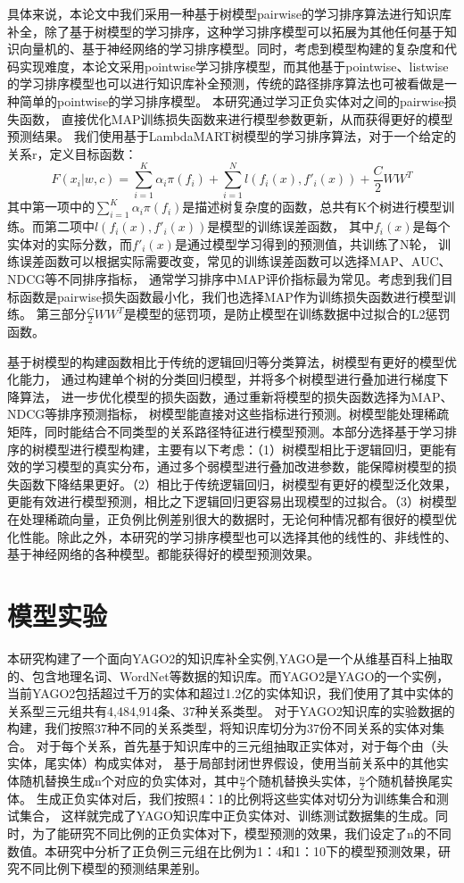 具体来说，本论文中我们采用一种基于树模型pairwise的学习排序算法进行知识库补全，除了基于树模型的学习排序，这种学习排序模型可以拓展为其他任何基于知识向量机的、基于神经网络的学习排序模型。同时，考虑到模型构建的复杂度和代码实现难度，本论文采用pointwise学习排序模型，而其他基于pointwise、listwise的学习排序模型也可以进行知识库补全预测，传统的路径排序算法也可被看做是一种简单的pointwise的学习排序模型。
本研究通过学习正负实体对之间的pairwise损失函数，
直接优化MAP训练损失函数来进行模型参数更新，从而获得更好的模型预测结果。
我们使用基于LambdaMART树模型的学习排序算法，对于一个给定的关系r，定义目标函数：
$$F(x_i|w,c)=\sum_{i=1}^K\alpha_i\pi(f_i)+\sum_{i=1}^Nl(f_i(x),f'_i(x))+\frac{C}{2}WW^T$$
其中第一项中的$\sum_{i=1}^K\alpha_i\pi(f_i)$是描述树复杂度的函数，总共有K个树进行模型训练。而第二项中$l(f_i(x),f'_i(x))$是模型的训练误差函数，
其中$f_i (x)$是每个实体对的实际分数，而$f'_i(x)$是通过模型学习得到的预测值，共训练了N轮，
训练误差函数可以根据实际需要改变，常见的训练误差函数可以选择MAP、AUC、NDCG等不同排序指标，
通常学习排序中MAP评价指标最为常见。考虑到我们目标函数是pairwise损失函数最小化，我们也选择MAP作为训练损失函数进行模型训练。
第三部分$\frac{C}{2}WW^T$是模型的惩罚项，是防止模型在训练数据中过拟合的L2惩罚函数。

基于树模型的构建函数相比于传统的逻辑回归等分类算法，树模型有更好的模型优化能力，
通过构建单个树的分类回归模型，并将多个树模型进行叠加进行梯度下降算法，
进一步优化模型的损失函数，通过重新将模型的损失函数选择为MAP、NDCG等排序预测指标，
树模型能直接对这些指标进行预测。树模型能处理稀疏矩阵，同时能结合不同类型的关系路径特征进行模型预测。本部分选择基于学习排序的树模型进行模型构建，主要有以下考虑：（1）树模型相比于逻辑回归，更能有效的学习模型的真实分布，通过多个弱模型进行叠加改进参数，能保障树模型的损失函数下降结果更好。（2）相比于传统逻辑回归，树模型有更好的模型泛化效果，更能有效进行模型预测，相比之下逻辑回归更容易出现模型的过拟合。（3）树模型在处理稀疏向量，正负例比例差别很大的数据时，无论何种情况都有很好的模型优化性能。除此之外，本研究的学习排序模型也可以选择其他的线性的、非线性的、基于神经网络的各种模型。都能获得好的模型预测效果。

\section{模型实验}
\label{cha:exp-relational}

本研究构建了一个面向YAGO2的知识库补全实例,YAGO是一个从维基百科上抽取的、包含地理名词、WordNet等数据的知识库。而YAGO2是YAGO的一个实例，
当前YAGO2包括超过千万的实体和超过1.2亿的实体知识，我们使用了其中实体的关系型三元组共有4,484,914条、37种关系类型。
对于YAGO2知识库的实验数据的构建，我们按照37种不同的关系类型，将知识库切分为37份不同关系的实体对集合。
对于每个关系，首先基于知识库中的三元组抽取正实体对，对于每个由（头实体，尾实体）构成实体对，
基于局部封闭世界假设，使用当前关系中的其他实体随机替换生成n个对应的负实体对，其中$\frac{n}{2}$个随机替换头实体，$\frac{n}{2}$个随机替换尾实体。
生成正负实体对后，我们按照4：1的比例将这些实体对切分为训练集合和测试集合，
这样就完成了YAGO知识库中正负实体对、训练测试数据集的生成。同时，为了能研究不同比例的正负实体对下，模型预测的效果，我们设定了n的不同数值。本研究中分析了正负例三元组在比例为1：4和1：10下的模型预测效果，研究不同比例下模型的预测结果差别。

